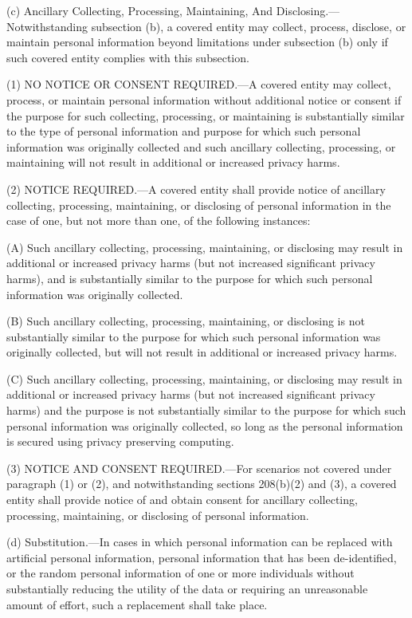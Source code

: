 (c) Ancillary Collecting, Processing, Maintaining, And Disclosing.—Notwithstanding subsection (b), a covered entity may collect, process, disclose, or maintain personal information beyond limitations under subsection (b) only if such covered entity complies with this subsection.

(1) NO NOTICE OR CONSENT REQUIRED.—A covered entity may collect, process, or maintain personal information without additional notice or consent if the purpose for such collecting, processing, or maintaining is substantially similar to the type of personal information and purpose for which such personal information was originally collected and such ancillary collecting, processing, or maintaining will not result in additional or increased privacy harms.

(2) NOTICE REQUIRED.—A covered entity shall provide notice of ancillary collecting, processing, maintaining, or disclosing of personal information in the case of one, but not more than one, of the following instances:

(A) Such ancillary collecting, processing, maintaining, or disclosing may result in additional or increased privacy harms (but not increased significant privacy harms), and is substantially similar to the purpose for which such personal information was originally collected.

(B) Such ancillary collecting, processing, maintaining, or disclosing is not substantially similar to the purpose for which such personal information was originally collected, but will not result in additional or increased privacy harms.

(C) Such ancillary collecting, processing, maintaining, or disclosing may result in additional or increased privacy harms (but not increased significant privacy harms) and the purpose is not substantially similar to the purpose for which such personal information was originally collected, so long as the personal information is secured using privacy preserving computing.

(3) NOTICE AND CONSENT REQUIRED.—For scenarios not covered under paragraph (1) or (2), and notwithstanding sections 208(b)(2) and (3), a covered entity shall provide notice of and obtain consent for ancillary collecting, processing, maintaining, or disclosing of personal information.

(d) Substitution.—In cases in which personal information can be replaced with artificial personal information, personal information that has been de-identified, or the random personal information of one or more individuals without substantially reducing the utility of the data or requiring an unreasonable amount of effort, such a replacement shall take place.


